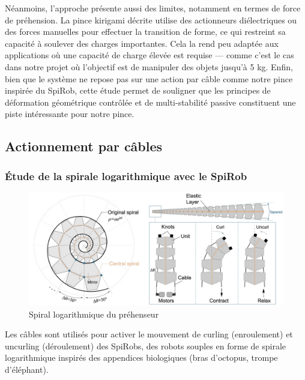 \documentclass[a4paper, 11pt]{report}
\begin{document}
            Néanmoins, l’approche présente aussi des limites, notamment en termes de force de préhension. La pince kirigami décrite utilise des actionneurs diélectriques ou des forces manuelles pour effectuer la transition de forme, ce qui restreint sa capacité à soulever des charges importantes. Cela la rend peu adaptée aux applications où une capacité de charge élevée est requise — comme c’est le cas dans notre projet où l’objectif est de manipuler des objets jusqu’à 5 kg. Enfin, bien que le système ne repose pas sur une action par câble comme notre pince inspirée du SpiRob, cette étude permet de souligner que les principes de déformation géométrique contrôlée et de multi-stabilité passive constituent une piste intéressante pour notre pince.
    
    \subsection{Actionnement par câbles}
    
        \subsubsection{Étude de la spirale logarithmique avec le SpiRob}
        
            \begin{figure}
                \centering
                \includegraphics[width=1.0\textwidth]{Figures/spiral_logarithm.png}
                \caption{Spiral logarithmique du préhenseur \cite{wang_spirobs_2025}}
                \label{fig:spiral_logarithm}
            \end{figure}
    
            Les câbles sont utilisés pour activer le mouvement de curling (enroulement) et uncurling (déroulement) des SpiRobs, des robots souples en forme de spirale logarithmique inspirés des appendices biologiques (bras d'octopus, trompe d'éléphant).
\end{document}
